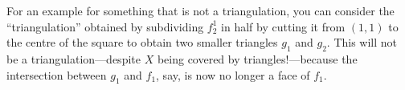 \documentclass{axolotl}
\begin{document}
For an example for something that is not a triangulation, you can consider the
``triangulation'' obtained by subdividing \(f_2^1\) in half by cutting it from
\((1,1)\) to the centre of the square to obtain two smaller triangles \(g_1\)
and \(g_2\). This will not be a triangulation---despite \(X\) being covered by
triangles!---because the intersection between \(g_1\) and \(f_1\), say, is now
no longer a face of \(f_1\).
\end{document}
